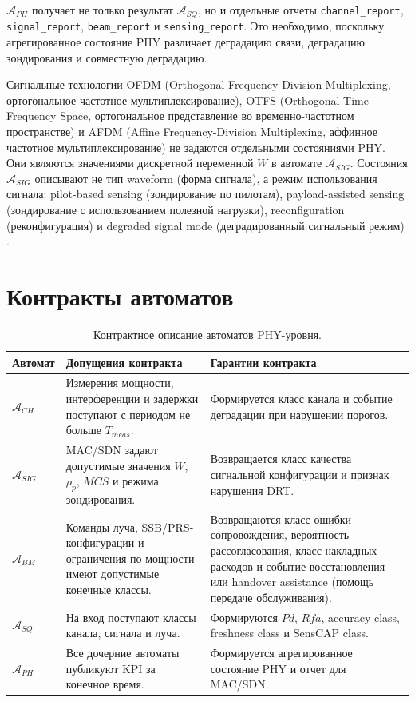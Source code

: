 \documentclass[12pt,a4paper]{article}
\begin{document}
\(\mathcal{A}_{PH}\) получает не только результат \(\mathcal{A}_{SQ}\), но и отдельные отчеты \texttt{channel\_report}, \texttt{signal\_report}, \texttt{beam\_report} и \texttt{sensing\_report}. Это необходимо, поскольку агрегированное состояние PHY различает деградацию связи, деградацию зондирования и совместную деградацию.

Сигнальные технологии OFDM (Orthogonal Frequency-Division Multiplexing, ортогональное частотное мультиплексирование), OTFS (Orthogonal Time Frequency Space, ортогональное представление во временно-частотном пространстве) и AFDM (Affine Frequency-Division Multiplexing, аффинное частотное мультиплексирование) не задаются отдельными состояниями PHY. Они являются значениями дискретной переменной $W$ в автомате $\mathcal{A}_{SIG}$. Состояния $\mathcal{A}_{SIG}$ описывают не тип waveform (форма сигнала), а режим использования сигнала: pilot-based sensing (зондирование по пилотам), payload-assisted sensing (зондирование с использованием полезной нагрузки), reconfiguration (реконфигурация) и degraded signal mode (деградированный сигнальный режим) \cite{li2025rethinking,qaisar2026role}.

\section{Контракты автоматов}

\begin{table}[htbp]
\centering
\small
\setlength{\tabcolsep}{4pt}
\begin{tabularx}{\textwidth}{p{}YY}
\toprule
Автомат & Допущения контракта & Гарантии контракта \\
\midrule
$\mathcal{A}_{CH}$ & Измерения мощности, интерференции и задержки поступают с периодом не больше $T_{meas}$. & Формируется класс канала и событие деградации при нарушении порогов. \\
$\mathcal{A}_{SIG}$ & MAC/SDN задают допустимые значения $W$, $\rho_p$, $MCS$ и режима зондирования. & Возвращается класс качества сигнальной конфигурации и признак нарушения DRT. \\
$\mathcal{A}_{BM}$ & Команды луча, SSB/PRS-конфигурации и ограничения по мощности имеют допустимые конечные классы. & Возвращаются класс ошибки сопровождения, вероятность рассогласования, класс накладных расходов и событие восстановления или handover assistance (помощь передаче обслуживания). \\
$\mathcal{A}_{SQ}$ & На вход поступают классы канала, сигнала и луча. & Формируются $Pd$, $Rfa$, accuracy class, freshness class и SensCAP class. \\
$\mathcal{A}_{PH}$ & Все дочерние автоматы публикуют KPI за конечное время. & Формируется агрегированное состояние PHY и отчет для MAC/SDN. \\
\bottomrule
\end{tabularx}
\caption{Контрактное описание автоматов PHY-уровня.}
\label{tab:contracts}
\end{table}
\end{document}
